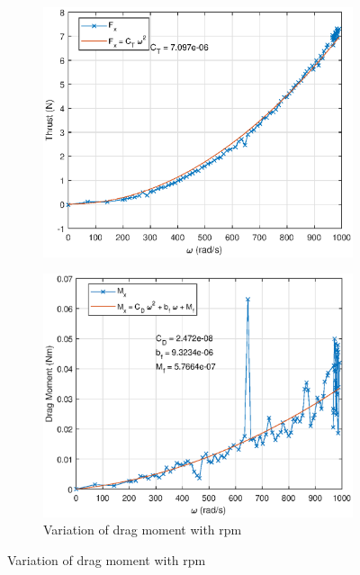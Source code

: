 \begin{figure}[H]
    \begin{minipage}{0.49\textwidth}
        \begin{figure}[H]
            \centering
            \includegraphics[width = \textwidth]{./figs/aero/Fx.eps}
        \end{figure}
        \caption{Variation of thrust with rpm}
    \end{minipage}
    \begin{minipage}{0.49\textwidth}
        \begin{figure}[H]
            \centering
            \includegraphics[width = \textwidth]{./figs/aero/Mx.eps}
            \caption{Variation of drag moment with rpm}
        \end{figure}
    \end{minipage}
\end{figure}
